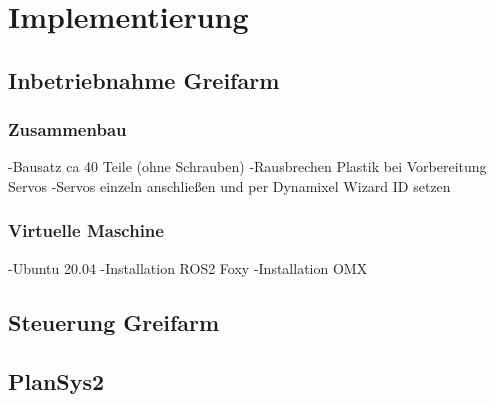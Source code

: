 \chapter{Implementierung}

\section {Inbetriebnahme Greifarm}
\subsection{Zusammenbau}
-Bausatz ca 40 Teile (ohne Schrauben)
-Rausbrechen Plastik bei Vorbereitung Servos
-Servos einzeln anschließen und per Dynamixel Wizard ID setzen
\subsection{Virtuelle Maschine}
-Ubuntu 20.04
-Installation ROS2 Foxy
-Installation OMX
\section{Steuerung Greifarm}

\section{PlanSys2}

\newpage